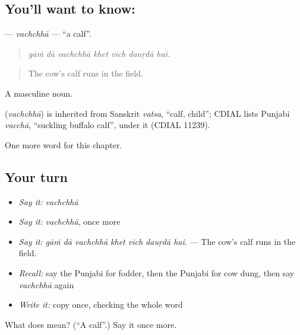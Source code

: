 \subsection*{You'll want to know: }
\textbf{} — \emph{vachchhā} — \textquotedblleft{}a calf\textquotedblright{}.

\begin{quote}
      
\end{quote}

\begin{quote}
\emph{gāṁ dā vachchhā khet vich dauṛdā hai.}
\end{quote}

\begin{quote}
The cow's calf runs in the field.
\end{quote}

A masculine noun.

\begin{cousinweb}
\textbf{} (\emph{vachchhā}) is inherited from Sanskrit \emph{vatsa}, \textquotedblleft{}calf, child\textquotedblright{}; CDIAL lists Punjabi \emph{vacchā}, \textquotedblleft{}suckling buffalo calf\textquotedblright{}, under it (CDIAL 11239).
\end{cousinweb}

\begin{grammarlens}[title={What you've built}]
One more word for this chapter.
\end{grammarlens}

\subsection*{Your turn}
\begin{itemize}
\raggedright
  \item \emph{Say it:} \emph{vachchhā}
  \item \emph{Say it:} \emph{vachchhā}, once more
  \item \emph{Say it:} \emph{gāṁ dā vachchhā khet vich dauṛdā hai.} — The cow's calf runs in the field.
  \item \emph{Recall:} say the Punjabi for fodder, then the Punjabi for cow dung, then say \emph{vachchhā} again
  \item \emph{Write it:} copy \textbf{} once, checking the whole word
\end{itemize}

\begin{tcolorbox}[breakable,colback=teal!4,colframe=teal!35!black,title={Before you move on}]
What does  mean? (\textquotedblleft{}A calf\textquotedblright{}.) Say it once more.
\end{tcolorbox}
